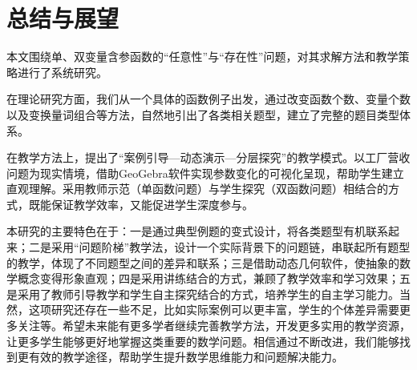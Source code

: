 
\chapter{总结与展望}

本文围绕单、双变量含参函数的“任意性”与“存在性”问题，对其求解方法和教学策略进行了系统研究。

在理论研究方面，我们从一个具体的函数例子出发，通过改变函数个数、变量个数以及变换量词组合等方法，自然地引出了各类相关题型，建立了完整的题目类型体系。

在教学方法上，提出了“案例引导—动态演示—分层探究”的教学模式。以工厂营收问题为现实情境，借助GeoGebra软件实现参数变化的可视化呈现，帮助学生建立直观理解。采用教师示范（单函数问题）与学生探究（双函数问题）相结合的方式，既能保证教学效率，又能促进学生深度参与。

本研究的主要特色在于：一是通过典型例题的变式设计，将各类题型有机联系起来；二是采用“问题阶梯”教学法，设计一个实际背景下的问题链，串联起所有题型的教学，体现了不同题型之间的差异和联系；三是借助动态几何软件，使抽象的数学概念变得形象直观；四是采用讲练结合的方式，兼顾了教学效率和学习效果；五是采用了教师引导教学和学生自主探究结合的方式，培养学生的自主学习能力。当然，这项研究还存在一些不足，比如实际案例可以更丰富，学生的个体差异需要更多关注等。希望未来能有更多学者继续完善教学方法，开发更多实用的教学资源，让更多学生能够更好地掌握这类重要的数学问题。相信通过不断改进，我们能够找到更有效的教学途径，帮助学生提升数学思维能力和问题解决能力。